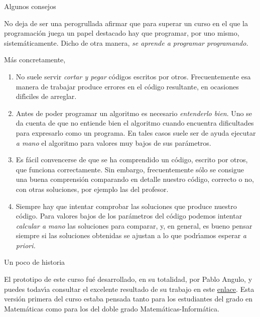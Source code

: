  
 
 
 
 
 
 
 \smallskip

{\sc Algunos consejos}


No deja de ser una perogrullada  afirmar que para superar un curso en el que
la programaci\'on juega un papel destacado hay que programar, por uno mismo,
sistem\'aticamente. Dicho de otra manera, {\itshape se aprende a programar
programando.}

M\'as concretamente,
\begin{enumerate}
 \item No suele servir {\itshape cortar y pegar}  c\'odigos escritos por
otros. Frecuentemente esa manera de trabajar produce errores  en el
c\'odigo resultante, en ocasiones dif\'{\i}ciles de arreglar.

\item Antes de poder programar un algoritmo es necesario {\itshape entenderlo
bien}. Uno se da cuenta de que no entiende bien el algoritmo cuando encuentra
dificultades para expresarlo como un programa. En tales casos suele ser de ayuda
ejecutar {\itshape a mano} el algoritmo para valores muy bajos de sus
par\'ametros. 

\item Es f\'acil convencerse de que se ha comprendido un c\'odigo, escrito por
otros, que funciona correctamente. Sin embargo, frecuentemente s\'olo se
consigue una buena comprensi\'on comparando en detalle nuestro c\'odigo,
correcto o no, con otras soluciones, por ejemplo las del  profesor. 

\item Siempre hay que intentar comprobar las soluciones que produce nuestro
c\'odigo. Para valores bajos de los par\'ametros del c\'odigo podemos intentar
 {\itshape calcular a mano} las soluciones para comparar, y, en general, es
bueno pensar siempre si las soluciones obtenidas se ajustan a lo que
podr\'{\i}amos esperar {\itshape a priori.}
 
 
 
\end{enumerate}




\smallskip

{\sc Un poco de historia}

El prototipo de este curso fu\'e desarrollado, en su totalidad,  por Pablo
Angulo, y puedes todav\'{\i}a consultar el excelente resultado de su trabajo en
este 
\href{http://verso.mat.uam.es/~pablo.angulo/doc/laboratorio/}{enlace}.
Esta
versi\'on primera del curso estaba pensada tanto
para los estudiantes del grado en Matem\'aticas como para los del doble grado
Matem\'aticas-Inform\'atica. 

